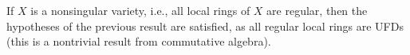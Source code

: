 If $X$ is a nonsingular variety, i.e., all local rings of $X$ are regular, then the hypotheses of the
previous result are satisfied, as all regular local rings are UFDs (this is a nontrivial result
from commutative algebra).
